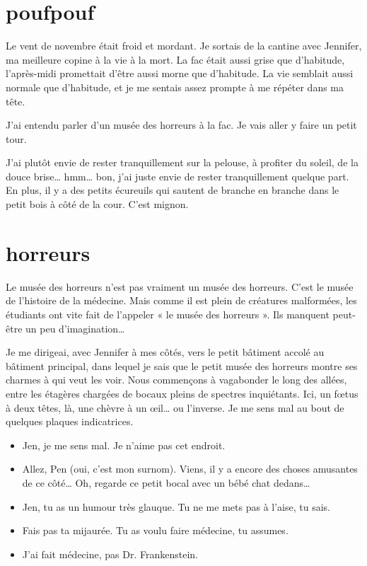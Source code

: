 \section{poufpouf}
Le vent de novembre était froid et mordant. Je sortais de la cantine avec Jennifer, ma meilleure copine à la vie à la mort. La fac était aussi grise que d'habitude, l'après-midi promettait d'être aussi morne que d'habitude. La vie semblait aussi normale que d'habitude, et je me sentais assez prompte à me répéter dans ma tête.

\item J'ai entendu parler d'un musée des horreurs à la fac. Je vais aller y faire un petit tour. 
\item J'ai plutôt envie de rester tranquillement sur la pelouse, à profiter du soleil, de la douce brise… hmm… bon, j'ai juste envie de rester tranquillement quelque part. En plus, il y a des petits écureuils qui sautent de branche en branche dans le petit bois à côté de la cour. C'est mignon. 
\enw

\section{horreurs}

Le musée des horreurs n'est pas vraiment un musée des horreurs. C'est le musée de l'histoire de la médecine. Mais comme il est plein de créatures malformées, les étudiants ont vite fait de l'appeler « le musée des horreurs ». Ils manquent peut-être un peu d'imagination…

Je me dirigeai, avec Jennifer à mes côtés, vers le petit bâtiment accolé au bâtiment principal, dans lequel je sais que le petit musée des horreurs montre ses charmes à qui veut les voir. Nous commençons à vagabonder le long des allées, entre les étagères chargées de bocaux pleins de spectres inquiétants. Ici, un fœtus à deux têtes, là, une chèvre à un œil… ou l'inverse. Je me sens mal au bout de quelques plaques indicatrices.

\begin{itemize}
\item Jen, je me sens mal. Je n'aime pas cet endroit.
\item Allez, Pen (oui, c'est mon surnom). Viens, il y a encore des choses amusantes de ce côté… Oh, regarde ce petit bocal avec un bébé chat dedans…
\item Jen, tu as un humour très glauque. Tu ne me mets pas à l'aise, tu sais.
\item Fais pas ta mijaurée. Tu as voulu faire médecine, tu assumes.
\item J'ai fait médecine, pas Dr. Frankenstein.
\end{itemize}

